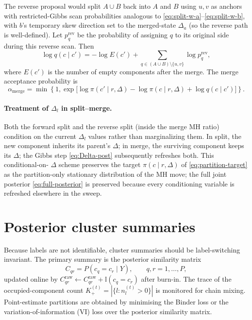 \documentclass[11pt]{article}
\newcommand{\ind}{\mathbb I}
\begin{document}
The reverse proposal would split $A\cup B$ back into $A$ and $B$ using
$u,v$ as anchors with restricted-Gibbs scan probabilities analogous to
\eqref{eq:split-w-a}--\eqref{eq:split-w-b}, with $b$'s temporary skew
direction set to the merged-state $\Delta_a$ (so the reverse path is
well-defined).  Let $p_q^{\mathrm{rev}}$ be the probability of assigning
$q$ to its original side during this reverse scan.  Then
\begin{equation}
    \log q(c\mid c')
    =
    -\log E(c')
    +\sum_{q\in(A\cup B)\setminus\{u,v\}}\log p_q^{\mathrm{rev}},
    \label{eq:merge-rev}
\end{equation}
where $E(c')$ is the number of empty components after the merge.  The
merge acceptance probability is
\begin{equation}
    \alpha_{\mathrm{merge}}
    =
    \min\!\left\{1,
    \exp\bigl[
    \log\pi(c'\mid r,\Delta)-\log\pi(c\mid r,\Delta)
    +\log q(c\mid c')
    \bigr]\right\}.
    \label{eq:merge-acc}
\end{equation}

\paragraph{Treatment of $\Delta_l$ in split--merge.}
Both the forward split and the reverse split (inside the merge MH ratio)
condition on the current $\Delta_l$ values rather than marginalizing them.
In split, the new component inherits its parent's $\Delta$; in merge, the
surviving component keeps its $\Delta$; the Gibbs step
\eqref{eq:Delta-post} subsequently refreshes both.  This conditional-on-
$\Delta$ scheme preserves the target $\pi(c\mid r,\Delta)$ of
\eqref{eq:partition-target} as the partition-only stationary distribution
of the MH move; the full joint posterior \eqref{eq:full-posterior} is
preserved because every conditioning variable is refreshed elsewhere in
the sweep.

\section{Posterior cluster summaries}

Because labels are not identifiable, cluster summaries should be
label-switching invariant.  The primary summary is the posterior
similarity matrix
\begin{equation}
    C_{qr}=P(c_q=c_r\mid Y),
    \qquad q,r=1,\dots,P,
\end{equation}
updated online by
$C_{qr}^{\mathrm{raw}}\leftarrow C_{qr}^{\mathrm{raw}}+\ind(c_q=c_r)$
after burn-in.  The trace of the occupied-component count
$K_+^{(t)}=|\{l:n_l^{(t)}>0\}|$ is monitored for chain mixing.
Point-estimate partitions are obtained by minimising the Binder loss or
the variation-of-information (VI) loss over the posterior similarity
matrix.
\end{document}
